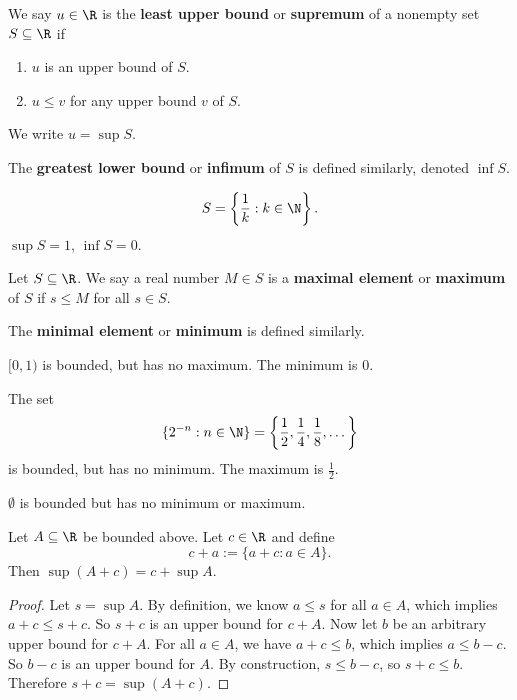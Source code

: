 \begin{definition}
  We say $u \in \R$ is the \textbf{least upper bound}
  or \textbf{supremum} of a nonempty set $S \subseteq \R$
  if
  \begin{enumerate}
    \item $u$ is an upper bound of $S$.
    \item $u \le v$ for any upper bound $v$ of $S$.
  \end{enumerate}
  We write $u = \sup S$.
\end{definition}

The \textbf{greatest lower bound} or \textbf{infimum}
of $S$ is defined similarly, denoted $\inf S$.

\begin{example}
  \[S = \left\{\frac{1}{k} : k \in \N\right\}.\]
  $\sup S = 1$,  $\inf S = 0$.
\end{example}

\begin{definition}
  Let $S \subseteq \R$. We say a real number
  $M \in S$ is a \textbf{maximal element} or
  \textbf{maximum} of $S$ if $s \le M$ for all
  $s \in S$.
\end{definition}

The \textbf{minimal element} or \textbf{minimum}
is defined similarly.

\begin{example}
  $[0, 1)$ is bounded, but has no maximum. The minimum is
  $0$.
\end{example}

\begin{example}
  The set
  \[\{2^{-n} : n \in \N\} = \left\{\frac{1}{2}, \frac{1}{4}, \frac{1}{8}, \dots\right\}\]
  is bounded, but has no minimum. The maximum is
  $\frac{1}{2}$.
\end{example}

\begin{example}
  $\emptyset$ is bounded but has no minimum or maximum.
\end{example}

\begin{exercise}
  Let $A \subseteq \R$ be bounded above. Let  $c \in \R$
  and define
  \[c + a := \{a + c : a \in A\}.\]
  Then  $\sup (A + c) = c + \sup A$.
\end{exercise}

\begin{proof}
  Let $s = \sup A$. By definition, we know  $a \le s$
  for all  $a \in A$, which implies
  $a + c \le s + c$. So $s + c$ is an upper bound
  for $c + A$.
  Now let  $b$ be an arbitrary upper bound
  for $c + A$.  For all $a \in A$, we have
  $a + c \le b$, which implies $a \le b - c$. So
  $b - c$ is an upper bound for  $A$. By construction,
  $s \le b - c$, so $s + c \le b$. Therefore
  $s + c = \sup (A + c)$.
\end{proof}

